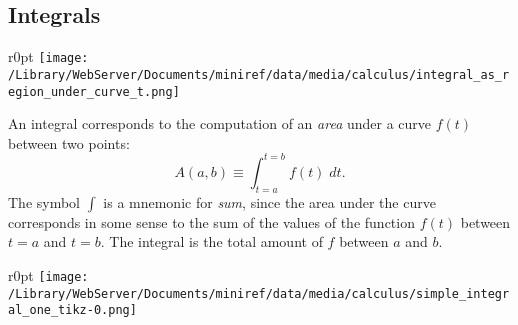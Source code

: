 \documentclass[letterpaper,9pt,journal]{IEEEtran}
\begin{document}
\vspace{-3mm}
\subsection{Integrals}
\label{3369022ed3e212789ba2790306add593}%
\begin{wrapfigure}{r}{0pt}
\texttt{[image: /Library/WebServer/Documents/miniref/data/media/calculus/integral\_as\_region\_under\_curve\_t.png]}
\end{wrapfigure}

An integral corresponds to the computation of an \emph{area}
under a curve $f(t)$ between two points:
\[
 A(a,b) \equiv \int_{t=a}^{t=b} f(t)\;dt.
\]
The symbol $\int$ is a mnemonic for \emph{sum}, 
since the area under the curve corresponds in some
sense to the sum of the values of the function $f(t)$
between $t=a$ and $t=b$.
The integral is the total amount of $f$ between $a$ and $b$.
%



\begin{wrapfigure}{r}{0pt}
\texttt{[image: /Library/WebServer/Documents/miniref/data/media/calculus/simple\_integral\_one\_tikz-0.png]}
\end{wrapfigure}
\end{document}
